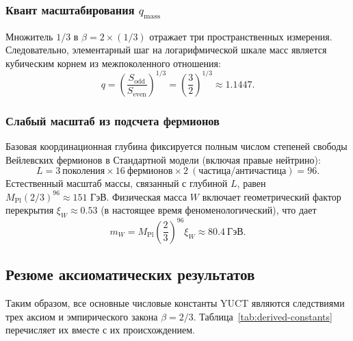 \documentclass[11pt,a4paper]{article}
\begin{document}
	\subsubsection{Квант масштабирования \(q_{\text{mass}}\)}
	Множитель \(1/3\) в \(\beta = 2 \times (1/3)\) отражает три пространственных измерения. Следовательно, элементарный шаг на логарифмической шкале масс является кубическим корнем из межпоколенного отношения:
	\[
	\boxed{q = \left(\frac{S_{\mathrm{odd}}}{S_{\mathrm{even}}}\right)^{1/3} = \left(\frac{3}{2}\right)^{1/3} \approx 1.1447}.
	\]
	
	\subsubsection{Слабый масштаб из подсчета фермионов}
	Базовая координационная глубина фиксируется полным числом степеней свободы Вейлевских фермионов в Стандартной модели (включая правые нейтрино):
	\[
	L = 3\ \text{поколения} \times 16\ \text{фермионов} \times 2\ (\text{частица/античастица}) = 96.
	\]
	Естественный масштаб массы, связанный с глубиной \(L\), равен \(M_{\mathrm{Pl}} (2/3)^{96} \approx 151\) ГэВ. Физическая масса \(W\) включает геометрический фактор перекрытия \(\xi_W \approx 0.53\) (в настоящее время феноменологический), что дает
	\[
	m_W = M_{\mathrm{Pl}} \left(\frac{2}{3}\right)^{96} \xi_W \approx 80.4\ \text{ГэВ}.
	\]
	
	\subsection{Резюме аксиоматических результатов}
	
	Таким образом, все основные числовые константы YUCT являются следствиями трех аксиом и эмпирического закона \(\beta=2/3\). Таблица~\ref{tab:derived-constants} перечисляет их вместе с их происхождением.
	
\end{document}
